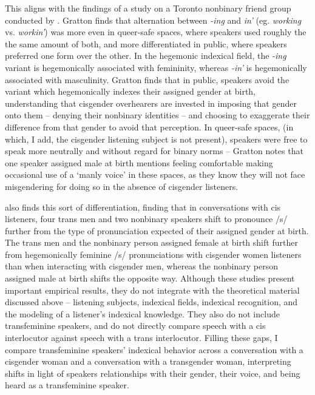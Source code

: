 \documentclass[12pt,twoside]{reedthesis}
\begin{document}
This aligns with the findings of a study on a Toronto nonbinary friend group conducted by \textcite{gratton_resisting_2016}. Gratton finds that alternation between \textit{-ing} and \textit{in'} (eg. \textit{working} vs. \textit{workin'}) was more even in queer-safe spaces, where speakers used roughly the the same amount of both, and more differentiated in public, where speakers preferred one form over the other. In the hegemonic indexical field, the \textit{-ing} variant is hegemonically associated with femininity, whereas  \textit{-in'} is hegemonically associated with masculinity. Gratton finds that in public, speakers avoid the variant which hegemonically indexes their assigned gender at birth, understanding that cisgender overhearers are invested in imposing that gender onto them -- denying their nonbinary identities -- and choosing to exaggerate their difference from that gender to avoid that perception. In queer-safe spaces, (in which, I add, the cisgender listening subject is not present), speakers were free to speak more neutrally and without regard for binary norms -- Gratton notes that one speaker assigned male at birth mentions feeling comfortable making occasional use of a `manly voice' in these spaces, as they know they will not face misgendering for doing so in the absence of cisgender listeners.

\textcite{parnell-mooney_transgender_2019} also finds this sort of differentiation, finding that in conversations with cis listeners, four trans men and two nonbinary speakers shift to pronounce /s/ further from the type of pronunciation expected of their assigned gender at birth. The trans men and the nonbinary person assigned female at birth shift further from hegemonically feminine /s/ pronunciations with cisgender women listeners than when interacting with cisgender men, whereas the nonbinary person assigned male at birth shifts the opposite way. Although these studies present important empirical results, they do not integrate with the theoretical material discussed above -- listening subjects, indexical fields, indexical recognition,  and the modeling of a listener's indexical knowledge. They also do not include transfeminine speakers, and do not directly compare speech with a cis interlocutor against speech with a trans interlocutor. Filling these gaps, I compare transfeminine speakers' indexical behavior across a conversation with a cisgender woman and a conversation with a transgender woman, interpreting shifts in light of speakers relationships with their gender, their voice, and being heard as a transfeminine speaker.
	
\end{document}
